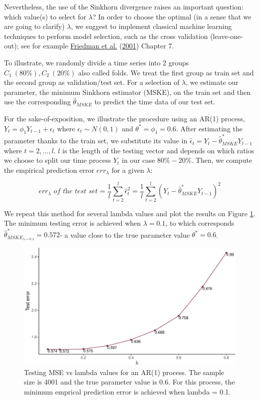 \documentclass[
  11pt,
]{article}
\begin{document}
Nevertheless, the use of the Sinkhorn divergence raises an important
question: which value(s) to select for \(\lambda\)? In order to choose
the optimal (in a sense that we are going to clarify) \(\lambda\), we
suggest to implement classical machine learning techniques to perform
model selection, such as the cross validation (leave-one-out); see for
example \protect\hyperlink{ref-friedman2001elements}{Friedman et al.}
(\protect\hyperlink{ref-friedman2001elements}{2001}) Chapter 7.

To illustrate, we randomly divide a time series into \(2\) groups
\(C_1 \ (80\%), C_2 \ (20\%)\) also called folds. We treat the first
group as train set and the second group as validation/test set. For a
selection of \(\lambda\), we estimate our parameter, the minimum
Sinkhorn estimator (MSKE), on the train set and then use the
corresponding \(\hat \theta_{MSKE}\) to predict the time data of our
test set.

For the sake-of-exposition, we illustrate the procedure using an AR(1)
process, \(Y_t = \phi_1 Y_{t-1} + \epsilon_t\) where
\(\epsilon_t \sim N(0,1)\) and \(\theta^* = \phi_1 = 0.6\). After
estimating the parameter thanks to the train set, we substitute its
value in \(\hat \epsilon_t = Y_t - \hat \theta^*_{MSKE} Y_{t-1}\) where
\(t = 2, ..., l\). \(l\) is the length of the testing vector and depends
on which ratios we choose to split our time process \({Y_t}\) in our
case \(80\% - 20\%\). Then, we compute the empirical prediction error
\(err_\lambda\) for a given \(\lambda\):

\[err_{\lambda} \textit{ of the test set} = \frac{1}{l}\sum_{t = 2}^l \hat \epsilon_t^2 = \frac{1}{l} \sum_{t = 2}^l (Y_t - \hat \theta^*_{MSKE} Y_{t-1})^2\]

We repeat this method for several lambda values and plot the results on
Figure \ref{fig:SH_CV}. The minimum testing error is achieved when
\(\lambda = 0.1\), to which corresponds
\(\hat \theta^*_{MSKE_{\lambda = 0.1}} = 0.572\)- a value close to the
true parameter value \(\theta^* = 0.6\).

\begin{figure}

{\centering \includegraphics[width=0.55\linewidth]{Master_thesis_V5_files/figure-latex/SH_CV-1} 

}

\caption{Testing MSE vs lambda values for an AR(1) process. The sample size is 4001 and the true parameter value is 0.6. For this process, the minimum emprical prediction error is achieved when lambda = 0.1.}\label{fig:SH_CV}
\end{figure}
\end{document}
